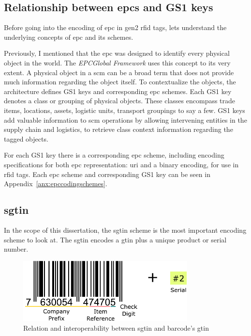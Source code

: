\subsection{Relationship between \acsp{epc} and GS1 keys}

Before going into the encoding of \ac{epc} in \ac{gen2} \ac{rfid} tags, lets understand the underlying concepts of \ac{epc} and its schemes.

Previously, I mentioned that the \ac{epc} was designed to identify every physical object in the world.
The \emph{EPCGlobal Framework} uses this concept to its very extent.
A physical object in a \ac{scm} can be a broad term that does not provide much information regarding the object itself.
To contextualize the objects, the architecture defines GS1 keys and corresponding \ac{epc} schemes.
Each GS1 key denotes a class or grouping of physical objects. These classes encompass trade items, locations, assets, logistic units, transport groupings to say a few.
GS1 keys add valuable information to \ac{scm} operations by allowing intervening entities in the supply chain and logistics, to retrieve class context information regarding the tagged objects.

For each GS1 key there is a corresponding \ac{epc} scheme, including encoding specifications for both \ac{epc} representation: \ac{uri} and a binary encoding, for use in \ac{rfid} tags.
Each \ac{epc} scheme and corresponding GS1 key can be seen in Appendix~\ref{anx:epccodingschemes}.

\subsection{\acs{sgtin}} \label{sec:sgtin}

In the scope of this dissertation, the \ac{sgtin} scheme is the most important encoding scheme to look at.
The \ac{sgtin} encodes a \ac{gtin} plus a unique product or serial number.

\begin{figure}[!ht]
    \centering
    \includegraphics[width=0.8\textwidth]{./figs/02-state-of-the-art/SGTIN_UPC_Compare.pdf}
    \caption[Relation and interoperability between \ac{sgtin} and barcode's \ac{gtin}]{Relation and interoperability between \ac{sgtin} and barcode's \ac{gtin}} 
    \label{fig:barcodesgtin}
\end{figure}

